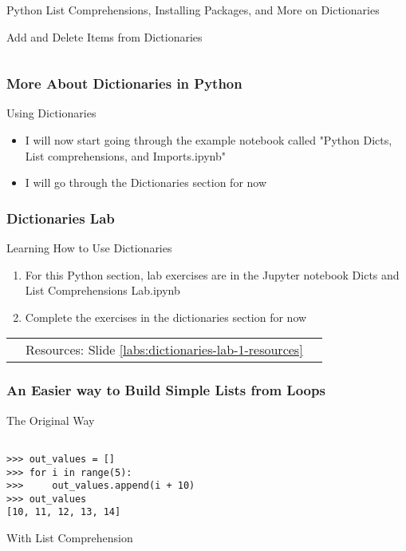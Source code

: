 \documentclass[handout, 11pt]{beamer}
\begin{document}
\begin{section}{Python List Comprehensions, Installing Packages, and More on Dictionaries}
\begin{frame}[fragile]
\begin{block}{Add and Delete Items from Dictionaries}
\begin{verbatim}
\end{verbatim}
\end{block}
\end{frame}
\begin{frame}
\frametitle{More About Dictionaries in Python}
{
\begin{block}{Using Dictionaries}
\begin{itemize}
\item I will now start going through the example notebook called "Python Dicts, List comprehensions, and Imports.ipynb"
\item I will go through the Dictionaries section for now
\end{itemize}
\end{block}
}
\end{frame}
\begin{frame}
\frametitle{Dictionaries Lab}
{
\begin{block}{Learning How to Use Dictionaries}
\begin{enumerate}
\item For this Python section, lab exercises are in the Jupyter notebook Dicts and List Comprehensions Lab.ipynb
\item Complete the exercises in the dictionaries section for now
\end{enumerate}
\vfill
\begin{tabular*}{\textwidth}{@{\extracolsep{\fill}}ccc}
\toprule
\hfill & Resources: Slide \textcolor{blue}{\underline{\ref{labs:dictionaries-lab-1-resources}}} & \hfill\\

\end{tabular*}
\end{block}
}
\label{labs:dictionaries-lab-1}
\end{frame}
\begin{frame}[fragile]
\frametitle{An Easier way to Build Simple Lists from Loops}
\small
\begin{block}{The Original Way}
\begin{verbatim}

>>> out_values = []
>>> for i in range(5):
>>>     out_values.append(i + 10)
>>> out_values
[10, 11, 12, 13, 14]

\end{verbatim}
\end{block}
\begin{block}{With List Comprehension}
\begin{verbatim}


\end{verbatim}
\end{block}
\end{frame}
\end{section}
\end{document}
